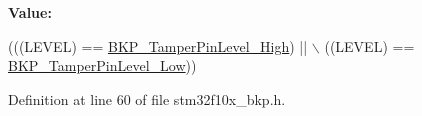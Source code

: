{\bfseries Value\+:}
\begin{DoxyCode}
(((LEVEL) == \hyperlink{group___tamper___pin__active__level_gae7203c3c0202cd68d201278c8be2b967}{BKP\_TamperPinLevel\_High}) || \(\backslash\)
                                        ((LEVEL) == \hyperlink{group___tamper___pin__active__level_gade9fc51f494eddcc4d88679c80fe39ce}{BKP\_TamperPinLevel\_Low}))
\end{DoxyCode}


Definition at line 60 of file stm32f10x\+\_\+bkp.\+h.

